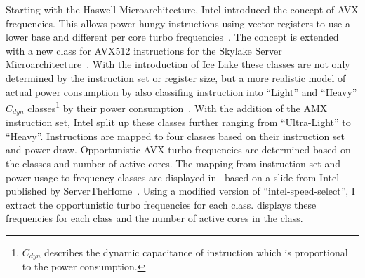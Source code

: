 Starting with the Haswell Microarchitecture, Intel introduced the concept of AVX frequencies.
This allows power hungy instructions using vector registers to use a lower base and different per core turbo frequencies~\cite{Hackenberg_2015_Haswell}.
The concept is extended with a new class for AVX512 instructions for the Skylake Server Microarchitecture~\cite[Sec. 2.6.3]{Intel_Optimization_Reference_Manual_050}.
With the introduction of Ice Lake these classes are not only determined by the instruction set or register size, but a more realistic model of actual power consumption by also classifing instruction into ``Light'' and ``Heavy'' $C_{dyn}$ classes\footnote{$C_{dyn}$ describes the dynamic capacitance of instruction which is proportional to the power consumption.} by their power consumption~\cite{papazian_new_2020}.
With the addition of the AMX instruction set, Intel split up these classes further ranging from ``Ultra-Light'' to ``Heavy''.
Instructions are mapped to four classes based on their instruction set and power draw.
Opportunistic AVX turbo frequencies are determined based on the classes and number of active cores.
The mapping from instruction set and power usage to frequency classes are displayed in~ based on a slide from Intel published by ServerTheHome~\cite{ServeTheHome_Emerald_Rapids_2023}.
Using a modified version of ``intel-speed-select'', I extract the opportunistic turbo frequencies for each class.
 displays these frequencies for each class and the number of active cores in the class.


